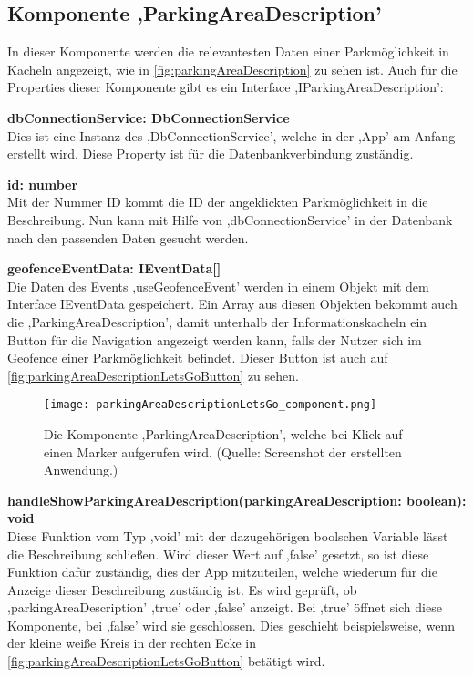 \subsection{Komponente ,ParkingAreaDescription'}
\label{handleFunctions}
In dieser Komponente werden die relevantesten Daten einer Parkmöglichkeit in Kacheln angezeigt, wie in \autoref{fig:parkingAreaDescription} zu sehen ist. Auch für die Properties dieser Komponente gibt es ein Interface ,IParkingAreaDescription':
\begin{description}
	\item \textbf{dbConnectionService: DbConnectionService} \\ Dies ist eine Instanz des ,DbConnectionService', welche in der ,App' am Anfang erstellt wird. Diese Property ist für die Datenbankverbindung zuständig.
	\item \textbf{id: number} \\ Mit der Nummer ID kommt die ID der angeklickten Parkmöglichkeit in die Beschreibung. Nun kann mit Hilfe von ,dbConnectionService' in der Datenbank nach den passenden Daten gesucht werden.
	\item \textbf{geofenceEventData: IEventData[]} \\ Die Daten des Events ,useGeofenceEvent' werden in einem Objekt mit dem Interface IEventData gespeichert. Ein Array aus diesen Objekten bekommt auch die ,ParkingAreaDescription', damit unterhalb der Informationskacheln ein Button für die Navigation angezeigt werden kann, falls der Nutzer sich im Geofence einer Parkmöglichkeit befindet. Dieser Button ist auch auf \autoref{fig:parkingAreaDescriptionLetsGoButton} zu sehen.
	\begin{figure}[h!]
		\centering
		\texttt{[image: parkingAreaDescriptionLetsGo\_component.png]}
		\caption[Die Komponente ,ParkingAreaDescription', welche bei Klick auf einen Marker aufgerufen wird.]
		{Die Komponente ,ParkingAreaDescription', welche bei Klick auf einen Marker aufgerufen wird. (Quelle: Screenshot der erstellten Anwendung.)}
		\label{fig:parkingAreaDescriptionLetsGoButton}
	\end{figure}
	\item \textbf{handleShowParkingAreaDescription(parkingAreaDescription: boolean): void} \\ Diese Funktion vom Typ ,void' mit der dazugehörigen boolschen Variable lässt die Beschreibung schließen. Wird dieser Wert auf ,false' gesetzt, so ist diese Funktion dafür zuständig, dies der App mitzuteilen, welche wiederum für die Anzeige dieser Beschreibung zuständig ist. Es wird geprüft, ob ,parkingAreaDescription' ,true' oder ,false' anzeigt. Bei ,true' öffnet sich diese Komponente, bei ,false' wird sie geschlossen. Dies geschieht beispielsweise, wenn der kleine weiße Kreis in der rechten Ecke in \autoref{fig:parkingAreaDescriptionLetsGoButton} betätigt wird.

\end{description}
